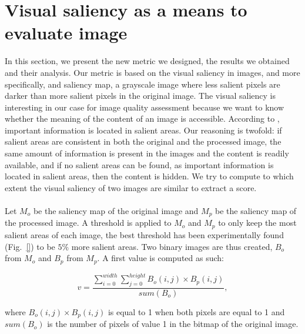 \documentclass{article}
\begin{document}
\section{Visual saliency as a means to evaluate image}
\label{sec:metric}
In this section, we present the new metric we designed, the results we obtained and their analysis. Our metric is based on the visual saliency in images, and more specifically, and saliency map, a grayscale image where less salient pixels are darker than more salient pixels in the original image. The visual saliency is interesting in our case for image quality assessment because we want to know whether the meaning of the content of an image is accessible. According to \cite{itti1998model}, important information is located in salient areas. Our reasoning is twofold: if salient areas are consistent in both the original and the processed image, the same amount of information is present in the images and the content is readily available, and if no salient areas can be found, as important information is located in salient areas, then the content is hidden. We try to compute to which extent the visual saliency of two images are similar to extract a score.

\paragraph*{}
Let $M_o$  be the saliency map of the original image and $M_p$ be the saliency map of the processed image. A threshold is applied to $M_o$ and $M_p$ to only keep the most salient areas of each image, the best threshold has been experimentally found (Fig.~\ref{}) to be $5\%$ more salient areas. Two binary images are thus created, $B_o$ from $M_o$ and $B_p$ from $M_p$. A first value is computed as such:

\begin{equation}
  \label{eqn:eqn}
  v = \frac{\sum_{i=0}^{width}\sum_{j=0}^{height}{B_o(i,j) \times B_p(i,j)}}{sum(B_o)},
\end{equation}

where $B_o(i,j) \times B_p(i,j)$ is equal to 1 when both pixels are equal to 1 and $sum(B_o)$ is the number of pixels of value 1 in the bitmap of the original image.
\end{document}
